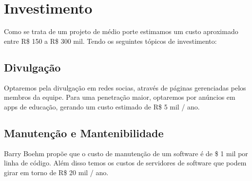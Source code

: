 \chapter[Investimento]{Investimento}

Como se trata de um projeto de médio porte estimamos um custo aproximado entre R\$ 150 a R\$ 300 mil. Tendo os seguintes tópicos de investimento:

    \section[Divulgação]{Divulgação} 
        Optaremos pela divulgação em redes socias, através de páginas gerenciadas pelos membros da equipe. Para uma penetração maior, optaremos por anúncios em apps de educação, gerando um custo estimado de R\$ 5 mil / ano.
    \section[Manutenção e Mantenabilidade]{Manutenção e Mantenibilidade}
        Barry Boehm propõe que o custo de manutenção de um software é de \$ 1 mil por linha de código. Além disso temos os custos de servidores de software que podem girar em torno de R\$ 20 mil / ano.

